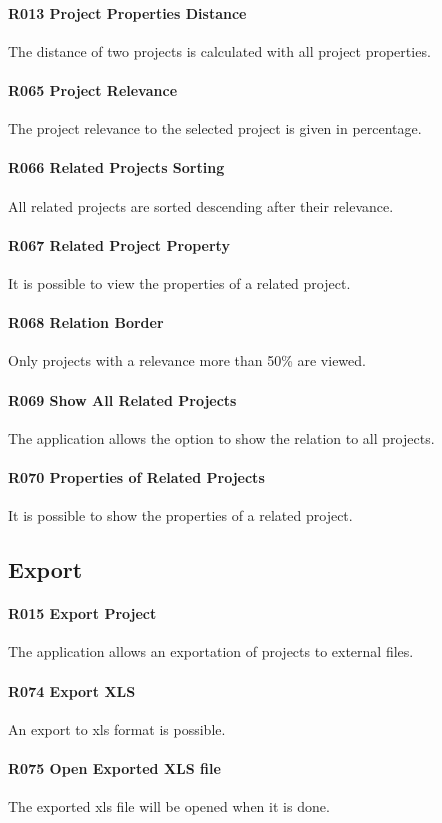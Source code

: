 \paragraph{R013 Project Properties Distance}
The distance of two projects is calculated with all project properties.
\paragraph{R065 Project Relevance}
The project relevance to the selected project is given in percentage.
\paragraph{R066 Related Projects Sorting}
All related projects are sorted descending after their relevance.
\paragraph{R067 Related Project Property}
It is possible to view the properties of a related project.
\paragraph{R068 Relation Border}
Only projects with a relevance more than 50\% are viewed.
\paragraph{R069 Show All Related Projects}
The application allows the option to show the relation to all projects.
\paragraph{R070 Properties of Related Projects}
It is possible to show the properties of a related project.

\subsection{Export}
\paragraph{R015 Export Project}
The application allows an exportation of projects to external files.
\paragraph{R074 Export XLS}
An export to xls format is possible.
\paragraph{R075 Open Exported XLS file}
The exported xls file will be opened when it is done.

